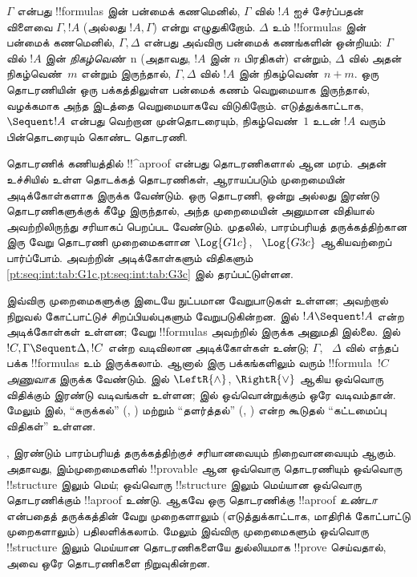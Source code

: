 \documentclass[../../../include/open-logic-section]{subfiles}
\begin{document}
$\Gamma$ என்பது
!!{formula}s இன்
பன்மைக் கணமெனில்,
$\Gamma$ வில் $!A$ ஐச்
சேர்ப்பதன் விளைவை
$\Gamma, !A$
(அல்லது $!A, \Gamma$)
என்று எழுதுகிறோம்.
$\Delta$ உம்
!!{formula}s இன்
பன்மைக் கணமெனில்,
$\Gamma, \Delta$
என்பது அவ்விரு
பன்மைக் கணங்களின்
ஒன்றியம்: $\Gamma$
வில் $!A$ இன்
\emph{நிகழ்வெண்}~n
(அதாவது, $!A$
இன் $n$ பிரதிகள்)
என்றும், $\Delta$
வில் அதன்
நிகழ்வெண்~$m$
என்றும் இருந்தால்,
$\Gamma, \Delta$
வில் $!A$ இன்
நிகழ்வெண்~$n+m$.
ஒரு தொடரணியின்
ஒரு பக்கத்திலுள்ள
பன்மைக் கணம்
வெறுமையாக இருந்தால்,
வழக்கமாக அந்த இடத்தை
வெறுமையாகவே விடுகிறோம்.
எடுத்துக்காட்டாக,
$\Sequent !A$
என்பது வெற்றான
முன்தொடரையும்,
நிகழ்வெண்~$1$
உடன் $!A$ வரும்
பின்தொடரையும்
கொண்ட தொடரணி.

தொடரணிக் கணியத்தில்
!!^a{proof} என்பது
தொடரணிகளால் ஆன
மரம். அதன் உச்சியில்
உள்ள தொடக்கத்
தொடரணிகள்,
ஆராயப்படும் முறைமையின்
அடிக்கோள்களாக
இருக்க வேண்டும்.
ஒரு தொடரணி,
ஒன்று அல்லது இரண்டு
தொடரணிகளுக்குக் கீழே
இருந்தால், அந்த
முறைமையின் அனுமான
விதியால் அவற்றிலிருந்து
சரியாகப் பெறப்பட
வேண்டும். முதலில்,
பாரம்பரியத் தருக்கத்திற்கான
இரு வேறு தொடரணி
முறைமைகளான
$\Log{G1c}$,
~$\Log{G3c}$
ஆகியவற்றைப் பார்ப்போம்.
அவற்றின் அடிக்கோள்களும்
விதிகளும்
\cref{pt:seq:int:tab:G1c,pt:seq:int:tab:G3c}
இல் தரப்பட்டுள்ளன.




இவ்விரு முறைமைகளுக்கு
இடையே நுட்பமான
வேறுபாடுகள் உள்ளன;
அவற்றால் நிறுவல்
கோட்பாட்டுச்
சிறப்பியல்புகளும்
வேறுபடுகின்றன.
 இல்
$!A \Sequent !A$
என்ற அடிக்கோள்கள்
உள்ளன; வேறு
!!{formula}s
அவற்றில் இருக்க
அனுமதி இல்லை.
 இல்
$!C, \Gamma \Sequent
\Delta, !C$
என்ற வடிவிலான
அடிக்கோள்கள் உண்டு;
$\Gamma$,
~$\Delta$ வில்
எந்தப் பக்க
!!{formula}s உம்
இருக்கலாம். ஆனால்
இரு பக்கங்களிலும்
வரும் !!{formula}~$!C$
\emph{அணுவாக}
இருக்க வேண்டும்.
 இல்
$\LeftR{\land}$,
$\RightR{\lor}$
ஆகிய ஒவ்வொரு விதிக்கும்
இரண்டு வடிவங்கள்
உள்ளன; 
இல் ஒவ்வொன்றுக்கும்
ஒரே வடிவம்தான்.
மேலும்  இல்,
“சுருக்கல்”
(\LeftR{\Contraction},
\RightR{\Contraction})
மற்றும் “தளர்த்தல்”
(\LeftR{\Weakening},
\RightR{\Weakening})
என்ற கூடுதல்
“கட்டமைப்பு விதிகள்”
உள்ளன.

, 
இரண்டும் பாரம்பரியத்
தருக்கத்திற்குச்
சரியானவையும்
நிறைவானவையும் ஆகும்.
அதாவது, இம்முறைமைகளில்
!!{provable} ஆன
ஒவ்வொரு தொடரணியும்
ஒவ்வொரு !!{structure}
இலும் மெய்; ஒவ்வொரு
!!{structure} இலும்
மெய்யான ஒவ்வொரு
தொடரணிக்கும்
!!a{proof} உண்டு.
ஆகவே ஒரு தொடரணிக்கு
!!a{proof} \emph{உண்டா}
என்பதைத் தருக்கத்தின்
வேறு முறைகளாலும்
(எடுத்துக்காட்டாக,
மாதிரிக் கோட்பாட்டு
முறைகளாலும்)
பதிலளிக்கலாம்.
மேலும் இவ்விரு
முறைமைகளும் ஒவ்வொரு
!!{structure} இலும்
மெய்யான தொடரணிகளையே
துல்லியமாக !!{prove}
செய்வதால், அவை
ஒரே தொடரணிகளை
நிறுவுகின்றன.
\end{document}
